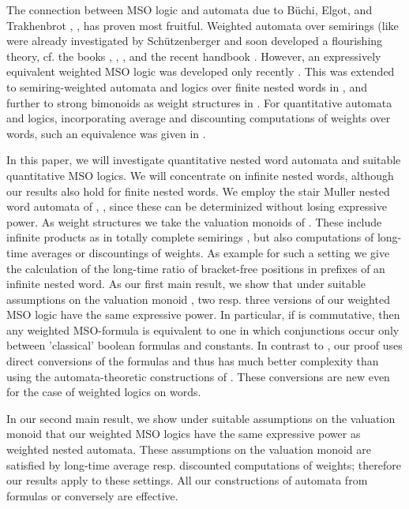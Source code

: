 \documentclass[runningheads, envcountsame, a4paper]{llncs}
\begin{document}
The connection between MSO logic and automata due to
B\"uchi, Elgot, and Trakhenbrot \cite{Bue}, \cite{Elg}, \cite{Tra} has proven most
fruitful. Weighted automata over semirings (like 
were already investigated by Sch\"utzenberger \cite{Sch} and
soon developed a flourishing theory, cf. the books
\cite{BR}, \cite{Eil}, \cite{KS}, \cite{SS} and the recent handbook \cite{DKV}.
However, an expressively equivalent weighted MSO logic was
developed only recently \cite{DG}. This was extended to
semiring-weighted automata and logics over finite nested words
in \cite{Ma}, and further to strong bimonoids as weight structures
in \cite{DP}. For quantitative automata and logics, incorporating
average and discounting computations of weights over words,
such an equivalence was given in \cite{DM}.

In this paper, we will investigate quantitative nested word
automata and suitable quantitative MSO logics. We will
concentrate on infinite nested words, although our
results also hold for finite nested words. We employ the stair
Muller nested word automata of \cite{AM}, \cite{LMS}, since these
can be determinized without losing expressive power. As weight structures
we take the valuation monoids of \cite{DM}. These include
infinite products as in totally complete semirings \cite{DR}, but also
computations of long-time averages or discountings of weights. As example for such a setting
we give the calculation of the long-time ratio of
bracket-free positions in prefixes of an infinite nested word.
As our first main result, we show that under suitable assumptions
on the valuation monoid , two resp. three versions of our
weighted MSO logic have the same expressive power.
In particular, if  is commutative, then any weighted MSO-formula is equivalent
to one in which conjunctions occur only between 'classical'
boolean formulas and constants.
In contrast
to \cite{DM}, our proof uses direct conversions of the formulas
and thus has much better complexity than using the
automata-theoretic constructions of \cite{DM}.
These conversions are new even for the case of weighted logics on words. 


In our second main result, we show under suitable assumptions
on the valuation monoid that our weighted MSO logics have
the same expressive power as weighted nested automata.
These assumptions on the valuation monoid are satisfied by
long-time average resp. discounted computations of weights;
therefore our results apply to these settings.
All our constructions of automata from formulas or conversely
are effective.
\end{document}
